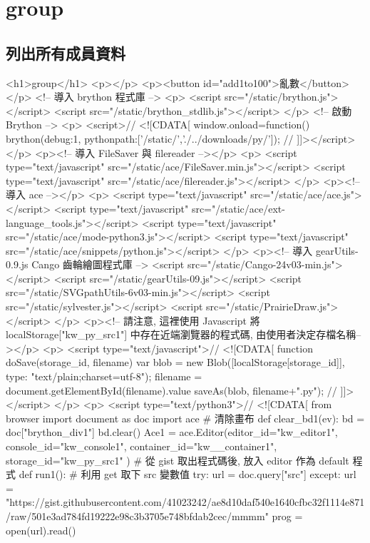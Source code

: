 \chapter{group}

\section{列出所有成員資料}
<h1>group</h1>
<p></p>
<p><button id="add1to100">亂數</button></p>
<!-- 導入 brython 程式庫 -->
<p>
<script src="/static/brython.js"></script>
<script src="/static/brython_stdlib.js"></script>
</p>
<!-- 啟動 Brython -->
<p>
<script>// <![CDATA[
window.onload=function(){
brython({debug:1, pythonpath:['/static/','./../downloads/py/']});
}
// ]]></script>
</p>
<p><!-- 導入 FileSaver 與 filereader --></p>
<p>
<script type="text/javascript" src="/static/ace/FileSaver.min.js"></script>
<script type="text/javascript" src="/static/ace/filereader.js"></script>
</p>
<p><!-- 導入 ace --></p>
<p>
<script type="text/javascript" src="/static/ace/ace.js"></script>
<script type="text/javascript" src="/static/ace/ext-language_tools.js"></script>
<script type="text/javascript" src="/static/ace/mode-python3.js"></script>
<script type="text/javascript" src="/static/ace/snippets/python.js"></script>
</p>
<p><!-- 導入 gearUtils-0.9.js Cango 齒輪繪圖程式庫 -->
<script src="/static/Cango-24v03-min.js"></script>
<script src="/static/gearUtils-09.js"></script>
<script src="/static/SVGpathUtils-6v03-min.js"></script>
<script src="/static/sylvester.js"></script>
<script src="/static/PrairieDraw.js"></script>
</p>
<p><!-- 請注意, 這裡使用 Javascript 將 localStorage["kw_py_src1"] 中存在近端瀏覽器的程式碼, 由使用者決定存檔名稱--></p>
<p>
<script type="text/javascript">// <![CDATA[
function doSave(storage_id, filename){
    var blob = new Blob([localStorage[storage_id]], {type: "text/plain;charset=utf-8"});
    filename = document.getElementById(filename).value
    saveAs(blob, filename+".py");
}
// ]]></script>
</p>
<p>
<script type="text/python3">// <![CDATA[
from browser import document as doc
import ace
# 清除畫布
def clear_bd1(ev):
    bd = doc["brython_div1"]
    bd.clear()
Ace1 = ace.Editor(editor_id="kw_editor1", console_id="kw_console1", container_id="kw__container1", storage_id="kw_py_src1" )
# 從 gist 取出程式碼後, 放入 editor 作為 default 程式
def run1():
    # 利用 get 取下 src 變數值
    try:
        url = doc.query["src"]
    except:
        url = "https://gist.githubusercontent.com/41023242/ae8d10daf540e1640cfbc32f1114e871/raw/501e3ad784fd19222e98c3b3705e748bfdab2cec/mmmm"
    prog = open(url).read()

